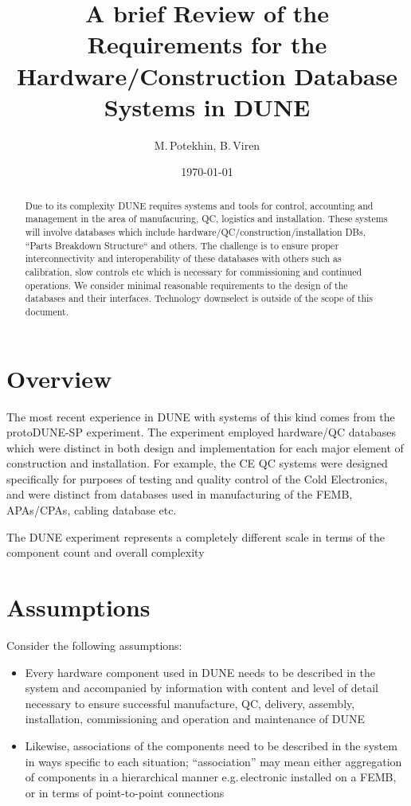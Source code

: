 \documentclass[pdftex,12pt,letter]{article}
\title{A brief Review of the Requirements for the Hardware/Construction Database Systems in DUNE}
\date{\today}
\author{M.\,Potekhin, B.\,Viren}
\begin{document}
\maketitle

\begin{abstract}
\noindent  Due to its complexity DUNE requires systems and tools for control, accounting and
management in the area of manufacuring, QC, logistics and installation. These systems will
involve databases which include hardware/QC/construction/installation DBs,
``Parts Breakdown Structure`` and others. The challenge is to ensure proper
interconnectivity and interoperability of these databases with others such as calibration,
slow controls etc which is necessary for commissioning and continued
operations. We consider minimal reasonable requirements to the design of the databases
and their interfaces. Technology downselect is outside of the scope of this document.

\end{abstract}


\section{Overview}

The most recent experience in DUNE with systems of this kind comes from the protoDUNE-SP experiment.
The experiment employed hardware/QC databases which were distinct in both
design and implementation for each major element of construction and installation. For example, the CE QC
systems were designed specifically for purposes of testing and quality control of the Cold Electronics,
and were distinct from databases used in manufacturing of the FEMB, APAs/CPAs, cabling database etc.

The DUNE experiment represents a completely different scale in terms of the component count and
overall complexity

\section{Assumptions}

Consider the following assumptions:

\begin{itemize}

\item Every hardware component used in DUNE needs to be described in the
system and accompanied by information with content and level of detail necessary to ensure
successful manufacture, QC, delivery, assembly, installation, commissioning and operation and maintenance of
DUNE

\item Likewise, associations of the components need to be described in the system
in ways specific to each situation; ``association'' may mean either aggregation of components
in a hierarchical manner e.g.\,electronic installed on a FEMB, or in terms of point-to-point connections

\end{itemize}
\end{document}
